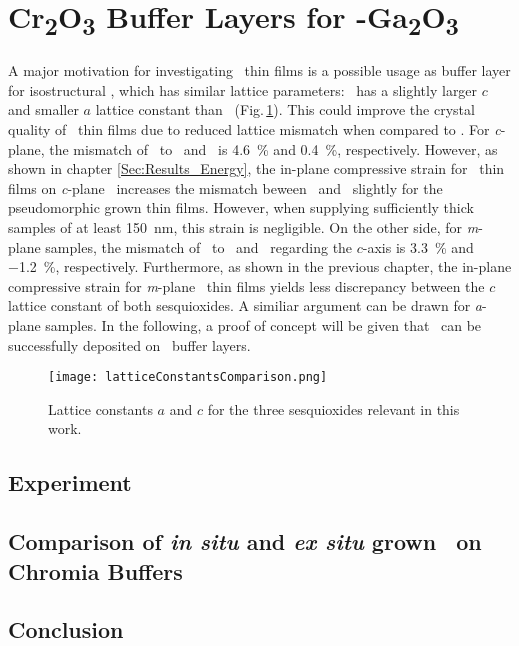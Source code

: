 \section{\texorpdfstring{C\lowercase{r}\textsubscript{2}O\textsubscript{3}}{Cr2O3} Buffer Layers for \texorpdfstring{\textalpha-G\lowercase{a}\textsubscript{2}O\textsubscript{3}}{a-Ga2O3}}
    \label{Sec:Results_Buffer}

A major motivation for investigating \cro\ thin films is a possible usage as buffer layer for isostructural \agao, which has similar lattice parameters:
\cro\ has a slightly larger $c$ and smaller $a$ lattice constant than \agao\ (Fig.\,\ref{Fig:Results_4_LatticeConstantsComp}).
This could improve the crystal quality of \agao\ thin films due to reduced lattice mismatch when compared to 
    \cite{stepanov2021}.
For \textit{c}-plane, the mismatch of \agao\ to \alo\ and \cro\ is \qty{4.6}{\percent} and \qty{0.4}{\percent}, respectively.
However, as shown in chapter \ref{Sec:Results_Energy}, the in-plane compressive strain for \cro\ thin films on \textit{c}-plane \alo\ increases the mismatch beween \cro\ and \agao\ slightly for the pseudomorphic grown thin films.
However, when supplying sufficiently thick samples of at least \qty{150}{\nm}, this strain is negligible.
On the other side, for \textit{m}-plane samples, the mismatch of \agao\ to \alo\ and \cro\ regarding the $c$-axis is \qty{3.3}{\percent} and \qty{-1.2}{\percent}, respectively.
Furthermore, as shown in the previous chapter, the in-plane compressive strain for \textit{m}-plane \cro\ thin films yields less discrepancy between the $c$ lattice constant of both sesquioxides.
A similiar argument can be drawn for \textit{a}-plane samples.
In the following, a proof of concept will be given that \agao\ can be successfully deposited on \cro\ buffer layers.
\begin{figure}[b]
    \centering
    \texttt{[image: latticeConstantsComparison.png]}
    \caption{Lattice constants $a$ and $c$ for the three sesquioxides relevant in this work.}
    \label{Fig:Results_4_LatticeConstantsComp}
\end{figure}

\subsection{Experiment}
    
\subsection{Comparison of \textit{in situ} and \textit{ex situ} grown \texorpdfstring{\gao}{Ga2O3}\ on Chromia Buffers}
    
\subsection{Conclusion}
    